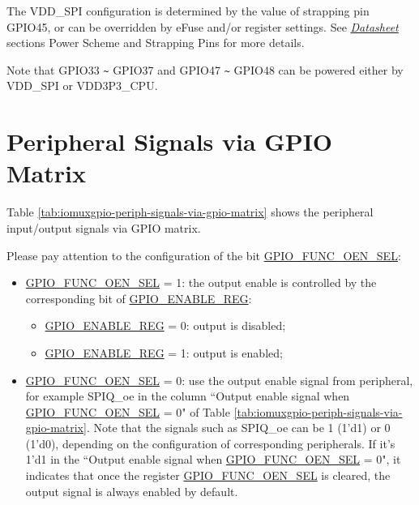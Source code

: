 \documentclass[main\_\_EN.tex]{subfiles}
\begin{document}
The VDD\_SPI configuration is determined by the value of strapping pin GPIO45, or can be overridden by eFuse and/or register settings. See {\it{\href{https://www.espressif.com/sites/default/files/documentation/esp32-s3_datasheet_en.pdf}{\chipname{} Datasheet}}} sections Power Scheme and Strapping Pins for more details.

Note that GPIO33 \verb+~+ GPIO37 and GPIO47 \verb+~+ GPIO48 can be powered either by VDD\_SPI or VDD3P3\_CPU.

\section{Peripheral Signals via GPIO Matrix}
\label{sec:peripheral_signals}

Table \ref{tab:iomuxgpio-periph-signals-via-gpio-matrix} shows the peripheral input/output signals via GPIO matrix.

Please pay attention to the configuration of the bit \hyperref[fielddesc:GPIOFUNCNOENSEL]{GPIO\_FUNC\_OEN\_SEL}:

\begin{itemize}
    \item \hyperref[fielddesc:GPIOFUNCNOENSEL]{GPIO\_FUNC\_OEN\_SEL} = 1: the output enable is controlled by the corresponding bit  of \hyperref[regdesc:GPIOENABLEREG]{GPIO\_ENABLE\_REG}:
    \begin{itemize}
        \item \hyperref[regdesc:GPIOENABLEREG]{GPIO\_ENABLE\_REG} = 0: output is disabled;
        \item \hyperref[regdesc:GPIOENABLEREG]{GPIO\_ENABLE\_REG} = 1: output is enabled;
    \end{itemize}
    \item \hyperref[fielddesc:GPIOFUNCNOENSEL]{GPIO\_FUNC\_OEN\_SEL} = 0: use the output enable signal from peripheral, for example SPIQ\_oe in the column ``Output enable signal when \hyperref[fielddesc:GPIOFUNCNOENSEL]{GPIO\_FUNC\_OEN\_SEL} = 0" of Table \ref{tab:iomuxgpio-periph-signals-via-gpio-matrix}. Note that the signals such as SPIQ\_oe can be 1 (1'd1) or 0 (1'd0), depending on the configuration of corresponding peripherals. If it's 1'd1 in the ``Output enable signal when \hyperref[fielddesc:GPIOFUNCNOENSEL]{GPIO\_FUNC\_OEN\_SEL} = 0", it indicates that once the register \hyperref[fielddesc:GPIOFUNCNOENSEL]{GPIO\_FUNC\_OEN\_SEL} is cleared, the output signal is always enabled by default.
\end{itemize}
\end{document}

